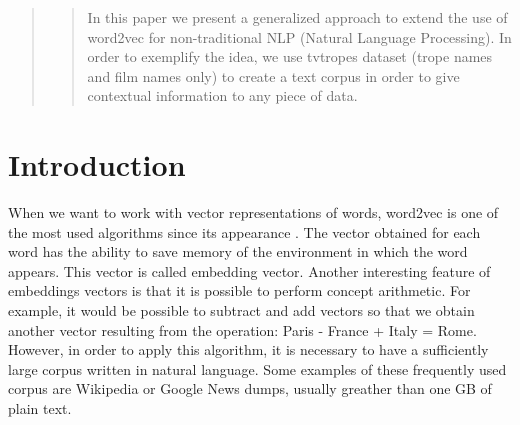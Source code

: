 \documentclass[letterpaper]{article}
\begin{document}
 
	\begin{abstract}
		\begin{quote}
			In this paper we present a generalized approach to extend the use of word2vec for non-traditional NLP (Natural Language Processing). In order to exemplify the idea, we use tvtropes dataset (trope names and film names only) to create a text corpus in order to give contextual information to any piece of data.
		\end{quote}
	\end{abstract}
	
	
	
	
	
	\section{Introduction}
	
	

    When we want to work with vector representations of words, word2vec is one of the most used algorithms since its appearance \cite{mikolov2013}.
    The vector obtained for each word has the ability to save memory of the environment in which the word appears. This vector is called embedding vector.
    Another interesting feature of embeddings vectors is that it is possible to perform concept arithmetic. For example, it would be possible to subtract and add vectors so that we obtain another vector resulting from the operation: Paris - France + Italy = Rome. However, in order to apply this algorithm, it is necessary to have a sufficiently large corpus written in natural language. Some examples of these frequently used corpus are Wikipedia or Google News dumps, usually greather than one GB of plain text. \\
    
\end{document}
